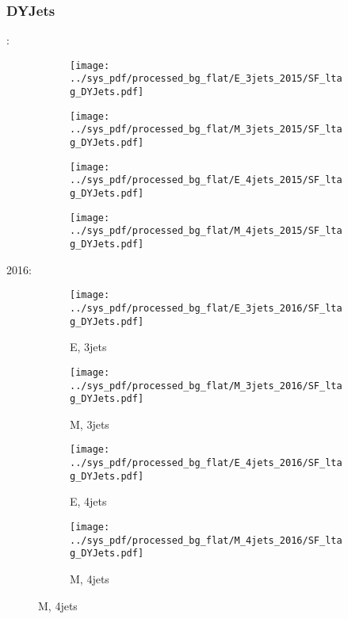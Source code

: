 \documentclass{beamer}
\begin{document}
\begin{frame}
\frametitle{DYJets}
\fontsize{5}{1}:
\begin{figure}
\centering
\begin{subfigure}[b]{0.24\textwidth}
\texttt{[image: ../sys\_pdf/processed\_bg\_flat/E\_3jets\_2015/SF\_ltag\_DYJets.pdf]}
\end{subfigure}
\begin{subfigure}[b]{0.24\textwidth}
\texttt{[image: ../sys\_pdf/processed\_bg\_flat/M\_3jets\_2015/SF\_ltag\_DYJets.pdf]}
\end{subfigure}
\begin{subfigure}[b]{0.24\textwidth}
\texttt{[image: ../sys\_pdf/processed\_bg\_flat/E\_4jets\_2015/SF\_ltag\_DYJets.pdf]}
\end{subfigure}
\begin{subfigure}[b]{0.24\textwidth}
\texttt{[image: ../sys\_pdf/processed\_bg\_flat/M\_4jets\_2015/SF\_ltag\_DYJets.pdf]}
\end{subfigure}
\end{figure}
2016:
\begin{figure}
\centering
\begin{subfigure}[b]{0.24\textwidth}
\texttt{[image: ../sys\_pdf/processed\_bg\_flat/E\_3jets\_2016/SF\_ltag\_DYJets.pdf]}
\captionsetup{font=tiny}
\caption{E, 3jets}
\end{subfigure}
\begin{subfigure}[b]{0.24\textwidth}
\texttt{[image: ../sys\_pdf/processed\_bg\_flat/M\_3jets\_2016/SF\_ltag\_DYJets.pdf]}
\captionsetup{font=tiny}
\caption{M, 3jets}
\end{subfigure}
\begin{subfigure}[b]{0.24\textwidth}
\texttt{[image: ../sys\_pdf/processed\_bg\_flat/E\_4jets\_2016/SF\_ltag\_DYJets.pdf]}
\captionsetup{font=tiny}
\caption{E, 4jets}
\end{subfigure}
\begin{subfigure}[b]{0.24\textwidth}
\texttt{[image: ../sys\_pdf/processed\_bg\_flat/M\_4jets\_2016/SF\_ltag\_DYJets.pdf]}
\captionsetup{font=tiny}
\caption{M, 4jets}
\end{subfigure}
\end{figure}
\end{frame}
\end{document}
